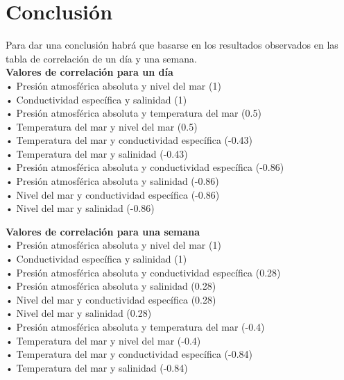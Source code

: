 \documentclass[12pt]{article}
\begin{document}
\section{Conclusión}

\noindent Para dar una conclusión habrá que basarse en los resultados observados en las tabla de correlación de un día y una semana. \\ [0.5em]
\noindent \textbf{Valores de correlación para un día} \\
\indent • Presión atmosférica absoluta y nivel del mar (1) \\
\indent • Conductividad específica y salinidad (1) \\
\indent • Presión atmosférica absoluta y temperatura del mar (0.5) \\
\indent • Temperatura del mar y nivel del mar (0.5) \\
\indent • Temperatura del mar y conductividad específica (-0.43) \\
\indent • Temperatura del mar y salinidad (-0.43) \\
\indent • Presión atmosférica absoluta y conductividad específica (-0.86) \\
\indent • Presión atmosférica absoluta y salinidad (-0.86) \\
\indent • Nivel del mar y conductividad específica (-0.86) \\
\indent • Nivel del mar y salinidad (-0.86) \\

\pagebreak

\noindent \textbf{Valores de correlación para una semana} \\
\indent • Presión atmosférica absoluta y nivel del mar (1) \\
\indent • Conductividad específica y salinidad (1) \\
\indent • Presión atmosférica absoluta y conductividad específica (0.28) \\
\indent • Presión atmosférica absoluta y salinidad (0.28) \\
\indent • Nivel del mar y conductividad específica (0.28) \\
\indent • Nivel del mar y salinidad (0.28) \\ 
\indent • Presión atmosférica absoluta y temperatura del mar (-0.4) \\
\indent • Temperatura del mar y nivel del mar (-0.4) \\
\indent • Temperatura del mar y conductividad específica (-0.84) \\
\indent • Temperatura del mar y salinidad (-0.84) \\
\end{document}

